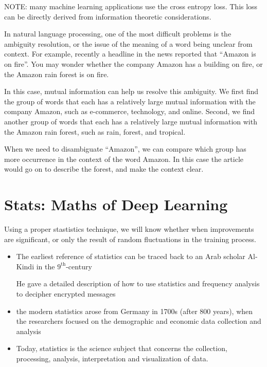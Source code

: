 NOTE:  many machine learning applications use the cross entropy loss.
This loss can be directly derived from information theoretic considerations.


In natural language processing, one of the most difficult problems is the
ambiguity resolution, or the issue of the meaning of a word being unclear from
context. For example, recently a headline in the news reported that “Amazon is
on fire”. You may wonder whether the company Amazon has a building on fire, or
the Amazon rain forest is on fire.

In this case, mutual information can help us resolve this ambiguity. We first
find the group of words that each has a relatively large mutual information with
the company Amazon, such as e-commerce, technology, and online. Second, we find
another group of words that each has a relatively large mutual information with
the Amazon rain forest, such as rain, forest, and tropical.


When we need to disambiguate “Amazon”, we can compare which group has more
occurrence in the context of the word Amazon. In this case the article would go
on to describe the forest, and make the context clear.






\chapter{Stats: Maths of Deep Learning}

Using a proper stastistics technique, we will know whether  when improvements
are significant, or only the result of random fluctuations in the training
process.

\begin{itemize}
  \item  The earliest reference of statistics can be traced back to an Arab scholar Al-Kindi in the $9^{\mathrm{th}}$-century
  
  He gave a detailed description of how to use statistics and frequency analysis to decipher encrypted messages
  
  \item the modern statistics arose from Germany in 1700s (after 800 years), when the researchers
  focused on the demographic and economic data collection and analysis
  
  \item Today, statistics is the science subject that concerns the collection,
  processing, analysis, interpretation and visualization of data.
\end{itemize}




